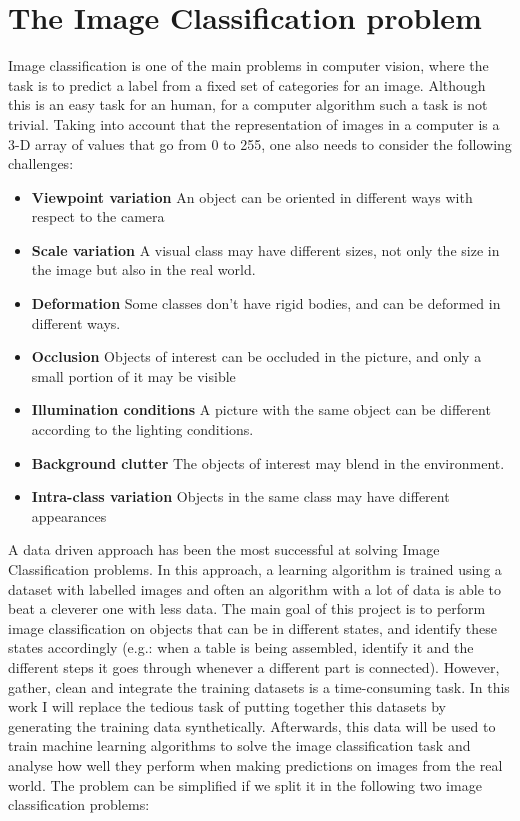 \documentclass[10pt,a4paper]{article}
\begin{document}
\section{The Image Classification problem}
Image classification is one of the main problems in computer vision, where the task is to predict a label from a fixed set of categories for an image. Although this is an easy task for an human, for a computer algorithm such a task is not trivial. Taking into account that the representation of images in a computer is a 3-D array of values that go from 0 to 255, one also needs to consider the following challenges\cite{stanfordic}:
\begin{itemize}
\item \textbf{Viewpoint variation} An object can be oriented in different ways with respect to the camera
\item \textbf{Scale variation} A visual class may have different sizes, not only the size in the image but also in the real world.
\item \textbf{Deformation} Some classes don't have rigid bodies, and can be deformed in different ways.
\item \textbf{Occlusion} Objects of interest can be occluded in the picture, and only a small portion of it may be visible
\item \textbf{Illumination conditions} A picture with the same object can be different according to the lighting conditions.
\item \textbf{Background clutter} The objects of interest may blend in the environment.
\item \textbf{Intra-class variation} Objects in the same class may have different appearances
\end{itemize}
A data driven approach has been the most successful at solving Image Classification problems. In this approach, a learning algorithm is trained using a dataset with labelled images and often an algorithm with a lot of data is able to beat a cleverer one with less data\cite{domingos2012few}. The main goal of this project is to perform image classification on objects that can be in different states, and identify these states accordingly (e.g.: when a table is being assembled, identify it and the different steps it goes through whenever a different part is connected). However, gather, clean and integrate the training datasets is a time-consuming task. In this work I will replace the tedious task of putting together this datasets by generating the training data synthetically. Afterwards, this data will be used to train machine learning algorithms to solve the image classification task and analyse how well they perform when making predictions on images from the real world. The problem can be simplified if we split it in the following two image classification problems:
\end{document}
